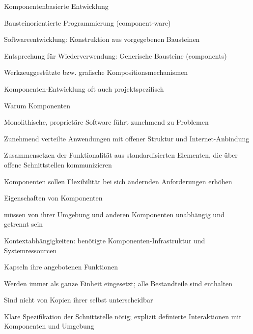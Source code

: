 \documentclass[a4paper]{article}
\begin{document}
\begin{multicols}{3}
  Komponentenbasierte Entwicklung
  \begin{itemize*}
    \item Bausteinorientierte Programmierung (component-ware)
    \item Softwareentwicklung: Konstruktion aus vorgegebenen Bausteinen
    \item Entsprechung für Wiederverwendung: Generische Bausteine (components)
    \item Werkzeuggestützte bzw. grafische Kompositionsmechanismen
    \item Komponenten-Entwicklung oft auch projektspezifisch
    \item Warum Komponenten
    \begin{itemize*}
      \item Monolithische, proprietäre Software führt zunehmend zu Problemen
      \item Zunehmend verteilte Anwendungen mit offener Struktur und Internet-Anbindung
      \item Zusammensetzen der Funktionalität aus standardisierten Elementen, die über offene Schnittstellen kommunizieren
      \item Komponenten sollen Flexibilität bei sich ändernden Anforderungen erhöhen
    \end{itemize*}
    \item Eigenschaften von Komponenten
    \begin{itemize*}
      \item müssen von ihrer Umgebung und anderen Komponenten unabhängig und getrennt sein
      \item Kontextabhängigkeiten: benötigte Komponenten-Infrastruktur und Systemressourcen
      \item Kapseln ihre angebotenen Funktionen
      \item Werden immer als ganze Einheit eingesetzt; alle Bestandteile sind enthalten
      \item Sind nicht von Kopien ihrer selbst unterscheidbar
      \item Klare Spezifikation der Schnittstelle nötig; explizit definierte Interaktionen mit Komponenten und Umgebung
    \end{itemize*}
  \end{itemize*}


\end{multicols}
\end{document}
